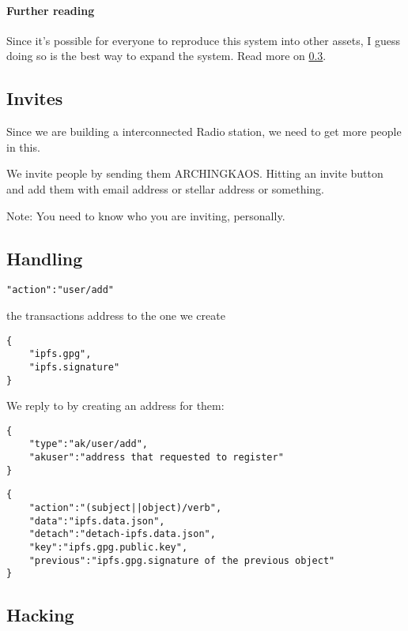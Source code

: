\documentclass[10pt,a4paper]{paper}
\begin{document}
	\paragraph{Further reading}\label{further-reading}

Since it's possible for everyone to reproduce this system into other
assets, I guess doing so is the best way to expand the system. Read more
on \ref{hacking}.

	\subsection{Invites}\label{invites}

Since we are building a interconnected Radio station, we need to get
more people in this.

We invite people by sending them ARCHINGKAOS. Hitting an invite button
and add them with email address or stellar address or something.

Note: You need to know who you are inviting, personally.


	\subsection{Handling}\label{handling}


\begin{verbatim}
"action":"user/add"
\end{verbatim}

the transactions address to the one we create 
\begin{verbatim}
{
    "ipfs.gpg",
    "ipfs.signature"
}
\end{verbatim}

We reply to by creating an address for them:
\begin{verbatim}
{
    "type":"ak/user/add",
    "akuser":"address that requested to register"
}
\end{verbatim}

 \begin{verbatim} 	
{
    "action":"(subject||object)/verb",
    "data":"ipfs.data.json",
    "detach":"detach-ipfs.data.json",
    "key":"ipfs.gpg.public.key",
    "previous":"ipfs.gpg.signature of the previous object"
}
\end{verbatim}

	\subsection{Hacking}\label{hacking}
\end{document}
